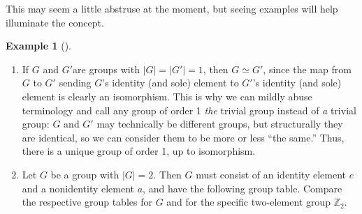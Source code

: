 \documentclass[10pt,]{book}
\theoremstyle{plain}
\theoremstyle{definition}
\theoremstyle{definition}
\theoremstyle{definition}
\newtheorem{example}[theorem]{Example}
\theoremstyle{definition}
\numberwithin{equation}{section}
\def\Z{\mathbb{Z}}
\begin{document}
    This may seem a little abstruse at the moment, but seeing examples will help illuminate the concept.
\begin{example}[]\label{example-28}
\leavevmode%
\begin{enumerate}
\item\hypertarget{li-147}{}
            If \(G\) and \(G'\)are groups with \(|G|=|G'|=1\), then \(G\simeq G'\), since the map from \(G\) to \(G'\) sending \(G\)'s identity (and sole) element to \(G'\)'s identity
            (and sole) element is clearly an isomorphism.  This is why we can mildly abuse terminology and call any group of order 1 \emph{the} trivial group instead of \emph{a} trivial group: \(G\) and
            \(G'\) may technically be different groups, but structurally they are identical, so we can consider them to be more or less ``the same.''  Thus, there is a unique group of order 1, up to isomorphism.
\item\hypertarget{li-148}{}
            Let \(G\) be a group with \(|G|=2\).  Then \(G\) must consist of an identity element \(e\) and a nonidentity element \(a\), and have the following group table. Compare the respective group tables for \(G\) and for the specific two-element group \(\Z_2\).
%
\par


\end{enumerate}
\end{example}
\end{document}
